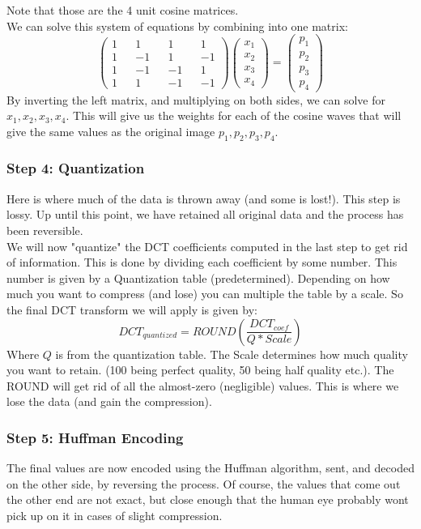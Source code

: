 \documentclass[12pt]{article}
\theoremstyle{definition}
\begin{document}
Note that those are the 4 unit cosine matrices. 
\\
We can solve this system of equations by combining into one matrix:
$$\begin{pmatrix}
1 && 1 && 1 && 1 \\
1 && -1 && 1 && -1 \\
1 && -1 && -1 && 1\\
1 && 1 && -1 && -1
\end{pmatrix}\begin{pmatrix}
x_1 \\ x_2 \\ x_3 \\ x_4
\end{pmatrix} = \begin{pmatrix}
p_1 \\ p_2 \\ p_3 \\ p_4
\end{pmatrix}$$
By inverting the left matrix, and multiplying on both sides, we can solve for $x_1, x_2, x_3, x_4$. This will give us the weights for each of the cosine waves that will give the same values as the original image $p_1, p_2, p_3, p_4$.

\subsubsection{Step 4: Quantization}
Here is where much of the data is thrown away (and some is lost!). This step is lossy. Up until this point, we have retained all original data and the process has been reversible.
\\ \linebreak
We will now "quantize" the DCT coefficients computed in the last step to get rid of information. This is done by dividing each coefficient by some number. This number is given by a Quantization table (predetermined). Depending on how much you want to compress (and lose) you can multiple the table by a scale. So the final DCT transform we will apply is given by:
$$DCT_{quantized} = ROUND(\frac{DCT_{coef}}{Q*Scale})$$
Where $Q$ is from the quantization table. The Scale determines how much quality you want to retain. (100 being perfect quality, 50 being half quality etc.). The ROUND will get rid of all the almost-zero (negligible) values. This is where we lose the data (and gain the compression). 
\\ \linebreak
\subsubsection{Step 5: Huffman Encoding}
The final values are now encoded using the Huffman algorithm, sent, and decoded on the other side, by reversing the process. Of course, the values that come out the other end are not exact, but close enough that the human eye probably wont pick up on it in cases of slight compression.
 
\end{document}
